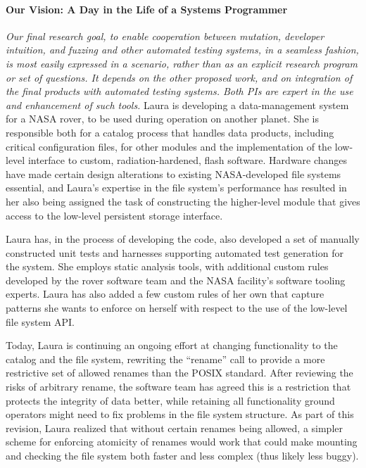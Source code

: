 \paragraph{Our Vision: A Day in the Life of a Systems Programmer}

\emph{Our final research goal, to enable cooperation between mutation, developer intuition, and fuzzing and other automated testing systems, in a seamless fashion, is most easily expressed in a scenario, rather than as an explicit research program or set of questions.  It depends on the other proposed work, and on integration of the final products with automated testing systems.  Both PIs are expert in the use and enhancement of such tools.}
Laura is developing a data-management system for a NASA rover, to be used during operation on another planet.  She is responsible both for a catalog process that handles data products, including critical configuration files, for other modules and the implementation of the low-level interface to custom, radiation-hardened, flash software.  Hardware changes have made certain design alterations to existing NASA-developed file systems essential, and Laura's expertise in the file system's performance has resulted in her also being assigned the task of constructing the higher-level module that gives access to the low-level persistent storage interface.

Laura has, in the process of developing the code, also developed a set of manually constructed unit tests and harnesses supporting automated test generation for the system.  She employs static analysis tools, with additional custom rules developed by the rover software team and the NASA facility's software tooling experts.  Laura has also added a few custom rules of her own that capture patterns she wants to enforce on herself with respect to the use of the low-level file system API.

Today, Laura is continuing an ongoing effort at changing functionality to the catalog and the file system, rewriting the ``rename'' call to provide a more restrictive set of allowed renames than the POSIX standard.  After reviewing the risks of arbitrary rename, the software team has agreed this is a restriction that protects the integrity of data better, while retaining all functionality ground operators might need to fix problems in the file system structure.  As part of this revision, Laura realized that without certain renames being allowed, a simpler scheme for enforcing atomicity of renames would work that could make mounting and checking the file system both faster and less complex (thus likely less buggy).

